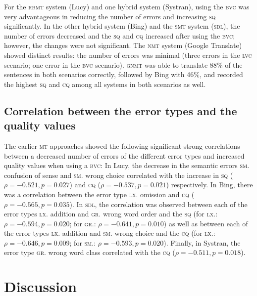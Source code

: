 \documentclass[output=paper]{langsci/langscibook}
\begin{document}
For the \textsc{rbmt} system (Lucy) and one hybrid system (Systran), using the \textsc{bvc} was very advantageous in reducing the number of errors and increasing \textsc{sq} significantly. In the other hybrid system (Bing) and the \textsc{smt} system \textsc{(sdl)}, the number of errors decreased and the \textsc{sq} and \textsc{cq} increased after using the \textsc{bvc}; however, the changes were not significant. The \textsc{nmt} system (Google Translate) showed distinct results: the number of errors was minimal (three errors in the \textsc{lvc} scenario; one error in the \textsc{bvc} scenario). \textsc{gnmt} was able to translate 88\% of the sentences in both scenarios correctly, followed by Bing with 46\%, and recorded the highest \textsc{sq} and \textsc{cq} among all systems in both scenarios as well.



\subsection{Correlation between the error types and the quality values}\largerpage[2]
The earlier \textsc{mt} approaches showed the following significant strong correlations between a decreased number of errors of the different error types and increased quality values when using a \textsc{bvc}: In Lucy, the decrease in the semantic errors \textsc{sm}. confusion of sense and \textsc{sm}. wrong choice correlated with the increase in \textsc{sq} ($\rho = -0.521, p = 0.027$) and \textsc{cq} ($\rho = -0.537, p = 0.021$) respectively. In Bing, there was a correlation between the error type \textsc{lx}. omission and \textsc{cq} ($\rho = -0.565, p = 0.035$). In \textsc{sdl}, the correlation was observed between each of the error types \textsc{lx}. addition and \textsc{gr}. wrong word order and the \textsc{sq} (for \textsc{lx}.: $\rho = -0.594, p = 0.020$; for \textsc{gr}.: $\rho = -0.641, p = 0.010$) as well as between each of the error types \textsc{lx}. addition and \textsc{sm}. wrong choice and the \textsc{cq} (for \textsc{lx}.: $\rho = -0.646, p = 0.009$; for \textsc{sm}.: $\rho = -0.593, p = 0.020$). Finally, in Systran, the error type \textsc{gr}. wrong word class correlated with the \textsc{cq} ($\rho = -0.511, p = 0.018$).


\section{Discussion}\label{marzouk:dis}
\end{document}
